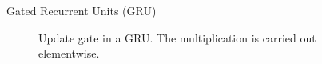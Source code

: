 \begin{vbframe}{Gated Recurrent Units (GRU)}
 \begin{figure}
      \centering
      \caption{\footnotesize{Update gate in a GRU. The multiplication is carried out elementwise.}}
  \end{figure}
  

\end{vbframe}

